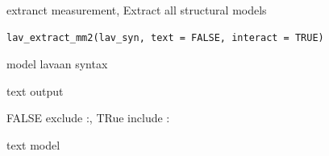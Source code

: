 \documentclass[a4paper]{book}
\begin{document}
%
\begin{Description}
extranct measurement, Extract all structural models
\end{Description}
%
\begin{Usage}
\begin{verbatim}
lav_extract_mm2(lav_syn, text = FALSE, interact = TRUE)
\end{verbatim}
\end{Usage}
%
\begin{Arguments}
\begin{ldescription}
\item[\code{lav\_syn}] model lavaan syntax

\item[\code{text}] text output

\item[\code{interact}] FALSE exclude :, TRue include :
\end{ldescription}
\end{Arguments}
%
\begin{Value}
text model
\end{Value}
%
\end{document}
